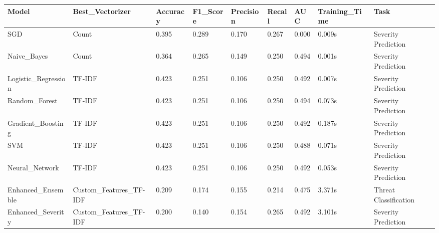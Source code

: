 \begin{tabular}{lllllllll}
\toprule
Model & Best_Vectorizer & Accuracy & F1_Score & Precision & Recall & AUC & Training_Time & Task \\
\midrule
SGD & Count & 0.395 & 0.289 & 0.170 & 0.267 & 0.000 & 0.009s & Severity Prediction \\
Naive_Bayes & Count & 0.364 & 0.265 & 0.149 & 0.250 & 0.494 & 0.001s & Severity Prediction \\
Logistic_Regression & TF-IDF & 0.423 & 0.251 & 0.106 & 0.250 & 0.492 & 0.007s & Severity Prediction \\
Random_Forest & TF-IDF & 0.423 & 0.251 & 0.106 & 0.250 & 0.494 & 0.073s & Severity Prediction \\
Gradient_Boosting & TF-IDF & 0.423 & 0.251 & 0.106 & 0.250 & 0.492 & 0.187s & Severity Prediction \\
SVM & TF-IDF & 0.423 & 0.251 & 0.106 & 0.250 & 0.488 & 0.071s & Severity Prediction \\
Neural_Network & TF-IDF & 0.423 & 0.251 & 0.106 & 0.250 & 0.492 & 0.053s & Severity Prediction \\
Enhanced_Ensemble & Custom_Features_TF-IDF & 0.209 & 0.174 & 0.155 & 0.214 & 0.475 & 3.371s & Threat Classification \\
Enhanced_Severity & Custom_Features_TF-IDF & 0.200 & 0.140 & 0.154 & 0.265 & 0.492 & 3.101s & Severity Prediction \\
\bottomrule
\end{tabular}
